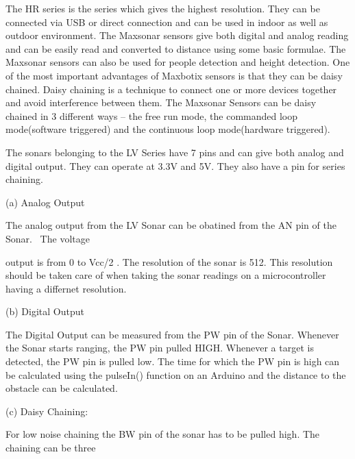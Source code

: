\documentclass[letterpaper]{article}
\begin{document}
\bigskip


\bigskip


\bigskip


\bigskip

{
The HR series is the series which gives the highest resolution. They can
be connected via USB or direct connection and can be used in indoor as
well as outdoor environment. The Maxsonar sensors give both digital and
analog reading and can be easily read and converted to distance using
some basic formulae. The Maxsonar sensors can also be used for people
detection and height detection. One of the most important advantages of
Maxbotix sensors is that they can be daisy chained. Daisy chaining is a
technique to connect one or more devices together and avoid
interference between them. The Maxsonar Sensors can be daisy chained in
3 different ways {}-- the free run mode, the commanded loop
mode(software triggered) and the continuous loop mode(hardware
triggered).}


\bigskip

{
The sonars belonging to the LV Series have 7 pins and can give both
analog and digital output. They can operate at 3.3V and 5V. They also
have a pin for series chaining.}


\bigskip

{
(a) Analog Output}

{
The analog output from the LV Sonar can be obatined from the AN pin of
the Sonar. \ The voltage}

{
output is from 0 to Vcc/2 . The resolution of the sonar is 512. This
resolution should be taken care of when taking the sonar readings on a
microcontroller having a differnet resolution.}


\bigskip

{
(b) Digital Output}

{
The Digital Output can be measured from the PW pin of the Sonar.
Whenever the Sonar starts ranging, the PW pin pulled HIGH. Whenever a
target is detected, the PW pin is pulled low. The time for which the PW
pin is high can be calculated using the pulseIn() function on an
Arduino and the distance to the obstacle can be calculated.}

\clearpage\setcounter{page}{1}\pagestyle{Convertedii}
{
(c) Daisy Chaining:}

{
For low noise chaining the BW pin of the sonar has to be pulled high.
The chaining can be three}
\end{document}
